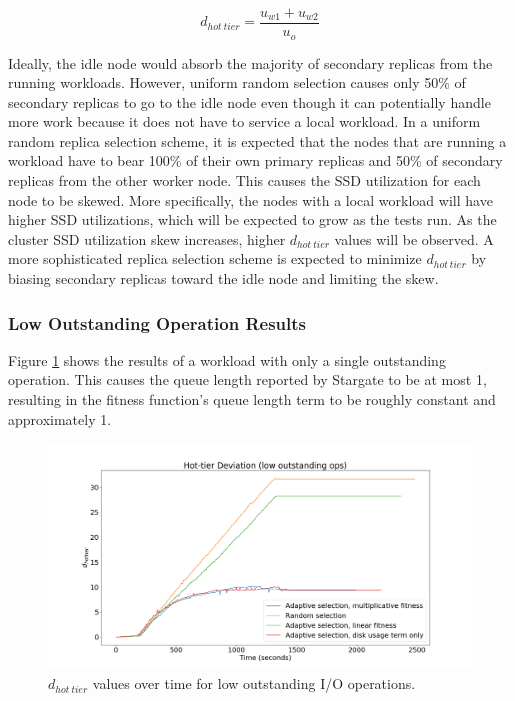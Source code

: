 \documentclass[12pt]{article}
\begin{document}
  \begin{equation}
    d_{hot\ tier} = \frac{u_{w1} + u_{w2}}{u_{o}}
  \end{equation}
  
  Ideally, the idle node would absorb the majority of secondary replicas from
  the running workloads. However, uniform random selection causes only 50\% of
  secondary replicas to go to the idle node even though it can potentially
  handle more work because it does not have to service a local
  workload. In a uniform random replica selection scheme, it is expected that
  the nodes that are running a workload have to bear 100\% of their own primary replicas
  and 50\% of secondary replicas from the other worker node. This causes the
  SSD utilization for each node to be skewed. More specifically, the nodes with
  a local workload will have higher SSD utilizations, which
  will be expected to grow as the tests run. As the cluster SSD utilization
  skew increases, higher $d_{hot\ tier}$ values will be observed.  A more
  sophisticated replica selection scheme is expected to minimize $d_{hot\ tier}$
  by biasing secondary replicas toward the idle node and limiting the
  skew.

    \subsubsection{Low Outstanding Operation Results}

    Figure \ref{fig:low_outstanding_tier_disparity} shows the results of a
    workload with only a single outstanding operation. This causes the queue
    length reported by Stargate to be at most 1, resulting in the fitness
    function's queue length term to be roughly constant and approximately 1.
    
    \begin{figure}[htbp]
      \centering
      \includegraphics[scale=0.32]{images/low_outstanding_exp.png} 
      \caption{$d_{hot\ tier}$ values over time for low outstanding I/O
               operations.}
      \label{fig:low_outstanding_tier_disparity}
    \end{figure}
\end{document}
